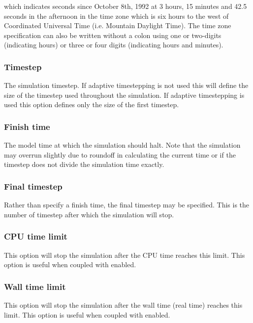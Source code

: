 which indicates seconds since October 8th, 1992 at 3 hours, 15 minutes and
42.5 seconds in the afternoon in the time zone which is six hours to the
west of Coordinated Universal Time (i.e. Mountain Daylight Time). The time
zone specification can also be written without a colon using one or
two-digits (indicating hours) or three or four digits (indicating hours and
minutes).


\subsubsection{Timestep}
The simulation timestep. If adaptive timestepping is not used this will
define the size of the timestep used throughout the simulation.  If adaptive
timestepping is used this option defines only the size of the first
timestep.

\subsubsection{Finish time}
The model time at which the simulation should halt. Note that the simulation
may overrun slightly due to roundoff in calculating the current time or if
the timestep does not divide the simulation time exactly.

\subsubsection{Final timestep}

Rather than specify a finish time, the final timestep may be specified. This is the number of timestep after which the simulation will stop.

\subsubsection{CPU time limit}

This option will stop the simulation after the CPU time reaches this limit.
This option is useful when coupled with
 enabled.

\subsubsection{Wall time limit}

This option will stop the simulation after the wall time (real time) reaches
this limit. This option is useful when coupled with
 enabled.

